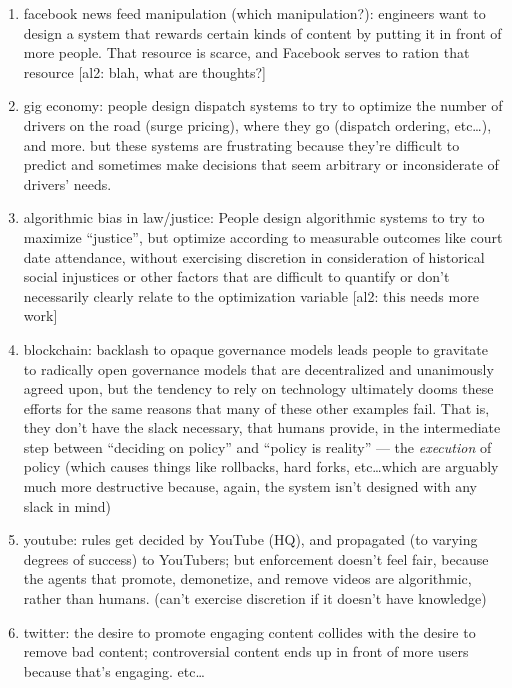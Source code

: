 \documentclass[10pt]{article}
\newcommand{\ali}[1]{{\color{Red}[al2: #1]}}
\begin{document}
\begin{enumerate}
  \item facebook news feed manipulation (which manipulation?): engineers want to design a system that rewards certain kinds of content by putting it in front of more people. That resource is scarce, and Facebook serves to ration that resource \ali{blah, what are thoughts?}
  \item gig economy: people design dispatch systems to try to optimize the number of drivers on the road (surge pricing), where they go (dispatch ordering, etc\dots), and more. but these systems are frustrating because they're difficult to predict and sometimes make decisions that seem arbitrary or inconsiderate of drivers' needs.
  \item algorithmic bias in law/justice: People design algorithmic systems to try to maximize ``justice'', but optimize according to measurable outcomes like court date attendance, without exercising discretion in consideration of historical social injustices or other factors that are difficult to quantify or don't necessarily clearly relate to the optimization variable \ali{this needs more work} 
  \item blockchain: backlash to opaque governance models leads people to gravitate to radically open governance models that are decentralized and unanimously agreed upon,
  but the tendency to rely on technology ultimately dooms these efforts for the same reasons that many of these other examples fail. That is, they don't have the slack necessary, that humans provide, in the intermediate step between ``deciding on policy'' and ``policy is reality'' --- the \textit{execution} of policy (which causes things like rollbacks, hard forks, etc\dots which are arguably much more destructive because, again, the system isn't designed with any slack in mind)
  \item youtube: rules get decided by YouTube (HQ), and propagated (to varying degrees of success) to YouTubers; but enforcement doesn't feel fair, because the agents that promote, demonetize, and remove videos are algorithmic, rather than humans. (can't exercise discretion if it doesn't have knowledge)
  \item twitter: the desire to promote engaging content collides with the desire to remove bad content; controversial content ends up in front of more users because that's engaging. etc\dots
\end{enumerate}


%   
%   
\end{document}
